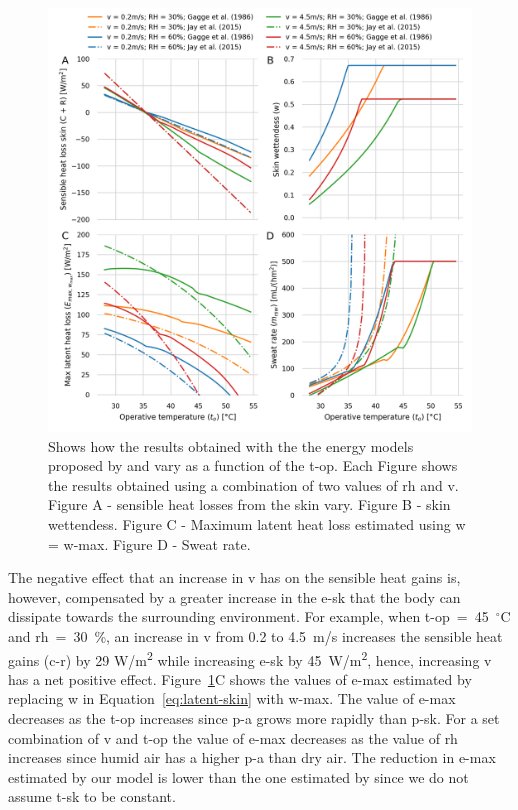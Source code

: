 \begin{figure}[thb!]
    \centering
    \includegraphics[width=\textwidth]{figures/comparison_models_v2.png}
    \caption{Shows how the results obtained with the the energy models proposed by  and  vary as a function of the \ac{t-op}.
    Each Figure shows the results obtained using a combination of two values of \ac{rh} and \ac{v}.
    Figure A - sensible heat losses from the skin vary.
    Figure B - skin wettendess.
    Figure C - Maximum latent heat loss estimated using \ac{w} = \ac{w-max}.
    Figure D - Sweat rate.}
    \label{fig:comparison_models}
\end{figure}

The negative effect that an increase in \ac{v} has on the sensible heat gains is, however, compensated by a greater increase in the \acf{e-sk} that the body can dissipate towards the surrounding environment.
For example, when \ac{t-op}~=~45~$^{\circ}$C and \ac{rh}~=~30~\%, an increase in \ac{v} from 0.2 to 4.5~m/s increases the sensible heat gains (\acs{c-r}) by 29 W/m\textsuperscript{2} while increasing \ac{e-sk} by 45~W/m\textsuperscript{2}, hence, increasing \ac{v} has a net positive effect.
Figure~\ref{fig:comparison_models}C shows the values of \ac{e-max} estimated by replacing \ac{w} in Equation~\ref{eq:latent-skin} with \ac{w-max}.
The value of \ac{e-max} decreases as the \ac{t-op} increases since \ac{p-a} grows more rapidly than \ac{p-sk}.
For a set combination of \ac{v} and \ac{t-op} the value of \ac{e-max} decreases as the value of \ac{rh} increases since humid air has a higher \ac{p-a} than dry air.
The reduction in \ac{e-max} estimated by our model is lower than the one estimated by  since we do not assume \ac{t-sk} to be constant.

